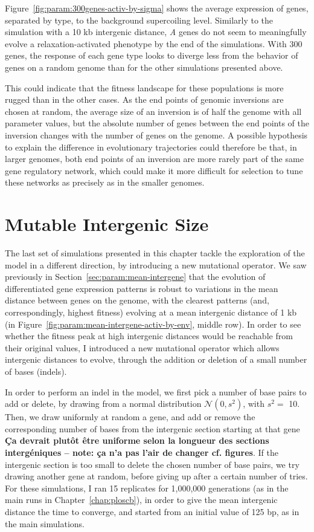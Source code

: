 Figure~\ref{fig:param:300genes-activ-by-sigma} shows the average expression of genes, separated by type, to the background supercoiling level.
Similarly to the simulation with a 10 kb intergenic distance, \emph{A} genes do not seem to meaningfully evolve a relaxation-activated phenotype by the end of the simulations.
With 300 genes, the response of each gene type looks to diverge less from the behavior of genes on a random genome than for the other simulations presented above.

This could indicate that the fitness landscape for these populations is more rugged than in the other cases.
As the end points of genomic inversions are chosen at random, the average size of an inversion is of half the genome with all parameter values, but the absolute number of genes between the end points of the inversion changes with the number of genes on the genome.
A possible hypothesis to explain the difference in evolutionary trajectories could therefore be that, in larger genomes, both end points of an inversion are more rarely part of the same gene regulatory network, which could make it more difficult for selection to tune these networks as precisely as in the smaller genomes.

\FloatBlock


\section{Mutable Intergenic Size}
\label{sec:param:evolve-intergene}

The last set of simulations presented in this chapter tackle the exploration of the model in a different direction, by introducing a new mutational operator.
We saw previously in Section~\ref{sec:param:mean-intergene} that the evolution of differentiated gene expression patterns is robust to variations in the mean distance between genes on the genome, with the clearest patterns (and, correspondingly, highest fitness) evolving at a mean intergenic distance of 1 kb (in Figure~\ref{fig:param:mean-intergene-activ-by-env}, middle row).
In order to see whether the fitness peak at high intergenic distances would be reachable from their original values, I introduced a new mutational operator which allows intergenic distances to evolve, through the addition or deletion of a small number of bases (indels).

In order to perform an indel in the model, we first pick a number of base pairs to add or delete, by drawing from a normal distribution $\mathcal{N}(0, s^2)$, with $s^2 = $ 10.
Then, we draw uniformly at random a gene, and add or remove the corresponding number of bases from the intergenic section starting at that gene \textbf{Ça devrait plutôt être uniforme selon la longueur des sections intergéniques -- note: ça n'a pas l'air de changer cf. figures}.
If the intergenic section is too small to delete the chosen number of base pairs, we try drawing another gene at random, before giving up after a certain number of tries.
For these simulations, I ran 15 replicates for 1,000,000 generations (as in the main runs in Chapter~\ref{chap:ploscb}), in order to give the mean intergenic distance the time to converge, and started from an initial value of 125 bp, as in the main simulations.


